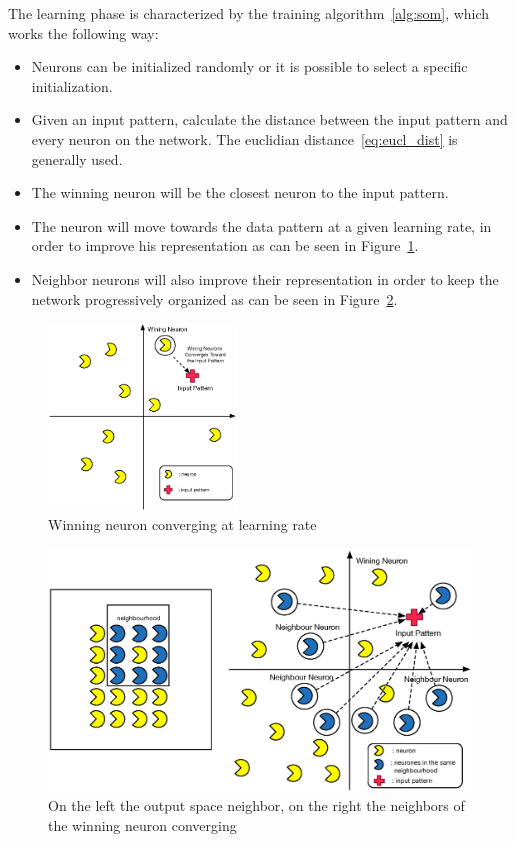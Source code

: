 

The learning phase is characterized by the training algorithm~\ref{alg:som}, which works the following way:
\begin{itemize}
  \item Neurons can be initialized randomly or it is possible to select a specific initialization.
  \item Given an input pattern, calculate the distance between the input pattern and every neuron on the network. The euclidian distance~\ref{eq:eucl_dist} is generally used.
  \item The winning neuron will be the closest neuron to the input pattern.
  \item The neuron will move towards the data pattern at a given learning rate, in order to improve his representation as can be seen in Figure~\ref{fig:4_wining_neuron_converge}.
  \item Neighbor neurons will also improve their representation in order to keep the network progressively organized as can be seen in Figure~\ref{fig:5_neighbours_converge}.
\end{itemize}



\begin{figure}
  \begin{center}
    \includegraphics[width=5cm]{images/4_wining_neuron_converge.eps}
  \end{center}
  \caption{ Winning neuron converging at learning rate }
  \label{fig:4_wining_neuron_converge}
\end{figure}

\begin{figure}
  \begin{center}
    \includegraphics[width=12cm]{images/5_neighbours_converge.eps}
  \end{center}
  \caption{ On the left the output space neighbor, on the right the neighbors of the winning neuron converging }
  \label{fig:5_neighbours_converge}
\end{figure}

